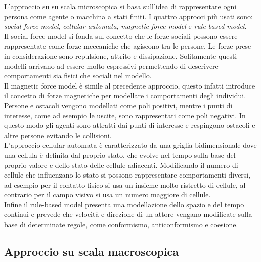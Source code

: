L'approccio su su scala microscopica si basa sull'idea di rappresentare ogni persona come agente o macchina a stati finiti. I quattro approcci più usati sono: \textit{social force model}, \textit{cellular automata}, \textit{magnetic force model} e \textit{rule-based model}.\\
Il social force model \cite{helbing} si fonda sul concetto che le forze sociali possono essere rappresentate come forze meccaniche che agiscono tra le persone. Le forze prese in considerazione sono repulsione, attrito e dissipazione. Solitamente questi modelli arrivano ad essere molto espressivi permettendo di descrivere comportamenti sia fisici che sociali nel modello.\\
Il magnetic force model \cite{okazaki} è simile al precedente approccio, questo infatti introduce il concetto di forze magnetiche per modellare i comportamenti degli individui. Persone e ostacoli vengono modellati come poli positivi, mentre i punti di interesse, come ad esempio le uscite, sono rappresentati come poli negativi. In questo modo gli agenti sono attratti dai punti di interesse e respingono ostacoli e altre persone evitando le collisioni.\\
L'approccio cellular automata \cite{dijkstra} è caratterizzato da una griglia bidimensionale dove una cellula è definita dal proprio stato, che evolve nel tempo sulla base del proprio valore e dello stato delle cellule adiacenti. Modificando il numero di cellule che influenzano lo stato si possono rappresentare comportamenti diversi, ad esempio per il contatto fisico si usa un insieme molto ristretto di cellule, al contrario per il campo visivo si usa un numero maggiore di cellule.\\
Infine il rule-based model \cite{reynolds} presenta una modellazione dello spazio e del tempo continui e prevede che velocità e  direzione di un attore vengano modificate sulla base di determinate regole, come conformismo, anticonformismo e coesione.\\

\subsection{Approccio su scala macroscopica}

